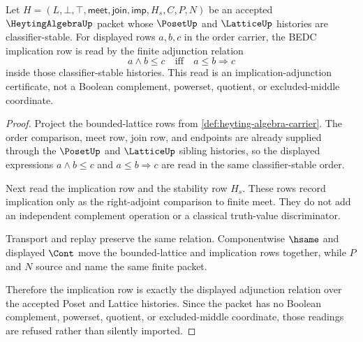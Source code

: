 \begin{theorem}
\label{thm:heyting-algebra-implication-adjunction}
Let $H=(L,\bot,\top,\mathsf{meet},\mathsf{join},\mathsf{imp},H_s,C,P,N)$ be an accepted $\HeytingAlgebraUp$ packet whose $\PosetUp$ and $\LatticeUp$ histories are classifier-stable. For displayed rows $a,b,c$ in the order carrier, the BEDC implication row is read by the finite adjunction relation
$$
a \wedge b \leq c \quad \text{iff} \quad a \leq b \Rightarrow c
$$
inside those classifier-stable histories. This read is an implication-adjunction certificate, not a Boolean complement, powerset, quotient, or excluded-middle coordinate.
\end{theorem}
\begin{proof}
Project the bounded-lattice rows from \autoref{def:heyting-algebra-carrier}. The order comparison, meet row, join row, and endpoints are already supplied through the $\PosetUp$ and $\LatticeUp$ sibling histories, so the displayed expressions $a \wedge b \leq c$ and $a \leq b \Rightarrow c$ are read in the same classifier-stable order.

Next read the implication row and the stability row $H_s$. These rows record implication only as the right-adjoint comparison to finite meet. They do not add an independent complement operation or a classical truth-value discriminator.

Transport and replay preserve the same relation. Componentwise $\hsame$ and displayed $\Cont$ move the bounded-lattice and implication rows together, while $P$ and $N$ source and name the same finite packet.

Therefore the implication row is exactly the displayed adjunction relation over the accepted Poset and Lattice histories. Since the packet has no Boolean complement, powerset, quotient, or excluded-middle coordinate, those readings are refused rather than silently imported.
\end{proof}


